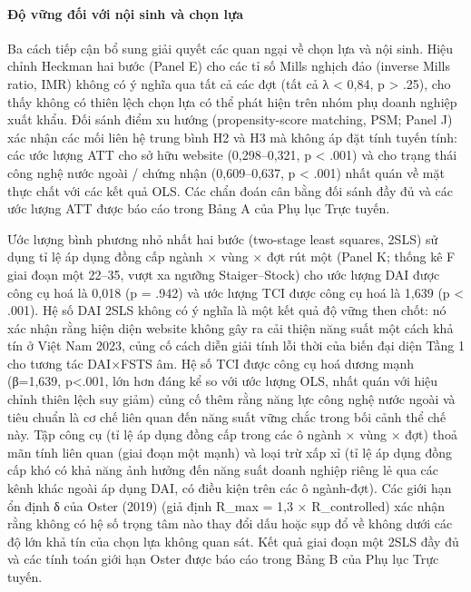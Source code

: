 \documentclass[12pt,a4paper]{article}
\begin{document}
\hypertarget{ux111ux1ed9-vux1eefng-ux111ux1ed1i-vux1edbi-nux1ed9i-sinh-vuxe0-chux1ecdn-lux1ef1a}{%
\paragraph{Độ vững đối với nội sinh và chọn
lựa}\label{ux111ux1ed9-vux1eefng-ux111ux1ed1i-vux1edbi-nux1ed9i-sinh-vuxe0-chux1ecdn-lux1ef1a}}

Ba cách tiếp cận bổ sung giải quyết các quan ngại về chọn lựa và nội
sinh. Hiệu chỉnh Heckman hai bước (Panel E) cho các tỉ số Mills nghịch
đảo (inverse Mills ratio, IMR) không có ý nghĩa qua tất cả các đợt (tất
cả \textbar λ\textbar{} \textless{} 0,84, p \textgreater{} .25), cho
thấy không có thiên lệch chọn lựa có thể phát hiện trên nhóm phụ doanh
nghiệp xuất khẩu. Đối sánh điểm xu hướng (propensity-score matching,
PSM; Panel J) xác nhận các mối liên hệ trung bình H2 và H3 mà không áp
đặt tính tuyến tính: các ước lượng ATT cho sở hữu website (0,298--0,321,
p \textless{} .001) và cho trạng thái công nghệ nước ngoài / chứng nhận
(0,609--0,637, p \textless{} .001) nhất quán về mặt thực chất với các
kết quả OLS. Các chẩn đoán cân bằng đối sánh đầy đủ và các ước lượng ATT
được báo cáo trong Bảng A của Phụ lục Trực tuyến.

Ước lượng bình phương nhỏ nhất hai bước (two-stage least squares, 2SLS)
sử dụng tỉ lệ áp dụng đồng cấp ngành × vùng × đợt rút một (Panel K;
thống kê F giai đoạn một 22--35, vượt xa ngưỡng Staiger--Stock) cho ước
lượng DAI được công cụ hoá là 0,018 (p = .942) và ước lượng TCI được
công cụ hoá là 1,639 (p \textless{} .001). Hệ số DAI 2SLS không có ý
nghĩa là một kết quả độ vững then chốt: nó xác nhận rằng hiện diện
website không gây ra cải thiện năng suất một cách khả tín ở Việt Nam
2023, củng cố cách diễn giải tính lỗi thời của biến đại diện Tầng 1 cho
tương tác DAI×FSTS âm. Hệ số TCI được công cụ hoá dương mạnh (β=1,639,
p\textless.001, lớn hơn đáng kể so với ước lượng OLS, nhất quán với hiệu
chỉnh thiên lệch suy giảm) củng cố thêm rằng năng lực công nghệ nước
ngoài và tiêu chuẩn là cơ chế liên quan đến năng suất vững chắc trong
bối cảnh thể chế này. Tập công cụ (tỉ lệ áp dụng đồng cấp trong các ô
ngành × vùng × đợt) thoả mãn tính liên quan (giai đoạn một mạnh) và loại
trừ xấp xỉ (tỉ lệ áp dụng đồng cấp khó có khả năng ảnh hưởng đến năng
suất doanh nghiệp riêng lẻ qua các kênh khác ngoài áp dụng DAI, có điều
kiện trên các ô ngành-đợt). Các giới hạn ổn định δ của Oster (2019) (giả
định R\_max = 1,3 × R\_controlled) xác nhận rằng không có hệ số trọng
tâm nào thay đổi dấu hoặc sụp đổ về không dưới các độ lớn khả tín của
chọn lựa không quan sát. Kết quả giai đoạn một 2SLS đầy đủ và các tính
toán giới hạn Oster được báo cáo trong Bảng B của Phụ lục Trực tuyến.
\end{document}
